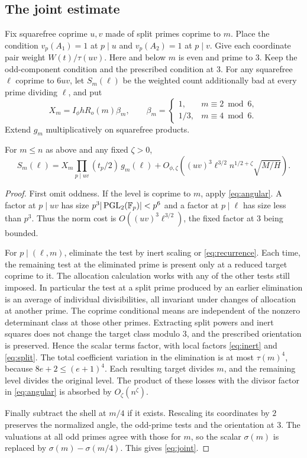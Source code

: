 \subsection{The joint estimate}
Fix squarefree coprime \(u,v\) made of split primes coprime to
\(m\). Place the condition \(v_p(A_1)=1\) at \(p\mid u\) and
\(v_p(A_2)=1\) at \(p\mid v\). Give each coordinate pair weight
\(W(t)/\tau(uv)\). Here and below \(m\) is even and prime to \(3\).
Keep the odd-component condition and the prescribed condition
at \(3\). For any squarefree \(\ell\) coprime to \(6uv\), let
\(S_m(\ell)\) be the weighted count additionally bad at every
prime dividing \(\ell\), and put
\[
 X_m=I_\phi h R_o(m)\beta_m,\qquad
 \beta_m=\begin{cases}1,&m\equiv2\bmod6,\\1/3,&m\equiv4\bmod6.\end{cases}
\]
Extend \(g_m\) multiplicatively on squarefree products.

\begin{lemma}\label{lem:joint}
For \(m\le n\) as above and any fixed \(\zeta>0\),
\begin{equation}\label{eq:joint}
 S_m(\ell)=X_m\prod_{p\mid uv}(t_p/2)\,g_m(\ell)
   +O_{\phi,\zeta}\!\left((uv)^3\ell^{3/2}n^{1/2+\zeta}
                                           \sqrt{M/H}\right).
\end{equation}
\end{lemma}
\begin{proof}
First omit oddness. If the level is coprime to \(m\), apply
\eqref{eq:angular}. A factor at \(p\mid uv\) has size
\(p^3|\operatorname{PGL}_2(\mathbb F_p)|<p^6\) and a factor at \(p\mid\ell\)
has size less than \(p^3\). Thus the norm cost is
\(O((uv)^3\ell^{3/2})\), the fixed factor at \(3\) being bounded.

For \(p\mid(\ell,m)\), eliminate the test by inert scaling or
\eqref{eq:recurrence}. Each time, the remaining test at the
eliminated prime is present only at a reduced target coprime to it.
The allocation calculation works with any of the other tests
still imposed. In particular the test at a split prime produced
by an earlier elimination is an average of individual
divisibilities, all invariant under changes of allocation at
another prime. The coprime conditional means are independent of
the nonzero determinant class at those other primes. Extracting
split powers and inert squares does not change the target class
modulo \(3\), and the prescribed orientation is preserved. Hence
the scalar terms factor, with local factors
\eqref{eq:inert} and \eqref{eq:split}. The total coefficient variation
in the elimination is at most \(\tau(m)^4\), because
\(8e+2\le(e+1)^4\). Each resulting target divides \(m\), and the
remaining level divides the original level. The product of these
losses with the divisor factor in \eqref{eq:angular} is absorbed
by \(O_\zeta(n^\zeta)\).

Finally subtract the shell at \(m/4\) if it exists. Rescaling its
coordinates by \(2\) preserves the normalized angle, the odd-prime
tests and the orientation at \(3\). The valuations at all odd
primes agree with those for \(m\), so the scalar \(\sigma(m)\)
is replaced by \(\sigma(m)-\sigma(m/4)\). This gives
\eqref{eq:joint}.
\end{proof}
